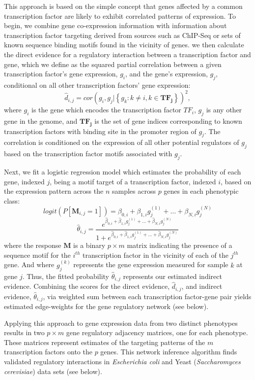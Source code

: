 This approach is based on the simple concept that genes affected by a common transcription factor are likely to exhibit correlated patterns of expression. To begin, we combine gene co-expression information with information about transcription factor targeting derived from sources such as ChIP-Seq or sets of known sequence binding motifs found in the vicinity of genes. we then calculate the direct evidence for a regulatory interaction between a transcription factor and gene, which we define as the squared partial correlation between a given transcription factor's gene expression, $g_{i}$, and the gene's expression, $g_{j}$, conditional on all other transcription factors' gene expression: 
\[
\hat{d}_{i,j}=cor\left(g_{i},g_{j}|\left\{ g_{k}:k\ne i,k\in\mathbf{TF_{j}}\right\} \right)^{2},
\]
where  $g_{i}$ is the gene which encodes the transcription factor $TF_{i}$, $g_{j}$ is any other gene in the genome, and $\mathbf{TF_{j}}$ is the set of gene indices corresponding to known transcription factors with binding site in the promoter region of $g_{j}$. The correlation is conditioned on the expression of all other potential regulators of $g_{j}$ based on the transcription factor motifs associated with $g_{j}$.

Next, we fit a logistic regression model which estimates the probability of each gene, indexed $j$, being a motif target of a transcription factor, indexed $i$, based on the expression pattern across the $n$ samples across $p$ genes in each phenotypic
class: 
\[
logit(P\left[\mathbf{M}_{i,j}=1\right])=\beta_{0,i}+\beta_{1,i}g_{j}^{\left(1\right)}+\dots+\beta_{N,i}g_{j}^{\left(N\right)}
\]
\[
\hat{\theta}_{i,j}=\frac{e^{\hat{\beta}_{0,i}+\hat{\beta}_{1,i}g_{j}^{\left(1\right)}+\dots+\hat{\beta}_{N,i}g_{j}^{\left(N\right)}}}{1+e^{\hat{\beta}_{0,i}+\hat{\beta}_{1,i}g_{j}^{\left(1\right)}+\dots+\hat{\beta}_{N,i}g_{j}^{\left(N\right)}}}
\]
where the response $\mathbf{M}$ is a binary $p\times m$ matrix indicating the presence of a sequence motif for the $i^{th}$ transcription factor in the vicinity of each of the $j^{th}$ gene. And where $g_{j}^{\left(k\right)}$ represents the gene expression measured for sample $k$ at gene $j$. Thus, the fitted probability $\hat{\theta}_{i,j}$ represents our estimated indirect evidence. Combining the scores for the direct evidence, $\hat{d}_{i,j}$, and indirect evidence, $\hat{\theta}_{i,j}$, via weighted sum between each transcription factor-gene pair yields estimated edge-weights for the gene regulatory network (see below).

Applying this approach to gene expression data from two distinct phenotypes results in two $p\times m$ gene regulatory adjacency matrices, one for each phenotype. These matrices represent estimates of the targeting patterns of the $m$ transcription factors onto the $p$ genes. This network inference algorithm finds validated regulatory interactions in \emph{Escherichia coli} and Yeast (\emph{Saccharomyces cerevisiae}) data sets (see below).

